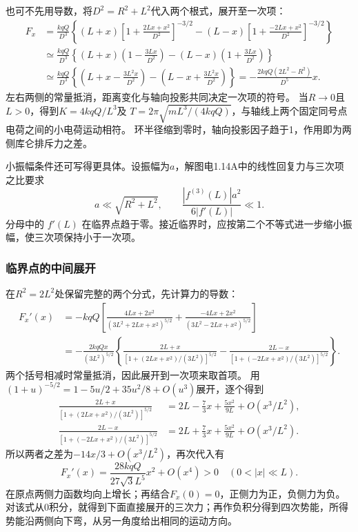\documentclass[UTF8,fontset=fandol,a4paper,11pt]{ctexart}
\begin{document}
也可不先用导数，将$D^2=R^2+L^2$代入两个根式，展开至一次项：
\[
\begin{aligned}
F_x&=\frac{kqQ}{D^3}\left\{(L+x)
 \left[1+\frac{2Lx+x^2}{D^2}\right]^{-3/2}
 -(L-x)\left[1+\frac{-2Lx+x^2}{D^2}\right]^{-3/2}\right\}\\
&\simeq\frac{kqQ}{D^3}\left\{(L+x)\left(1-\frac{3Lx}{D^2}\right)
 -(L-x)\left(1+\frac{3Lx}{D^2}\right)\right\}\\
&\simeq\frac{kqQ}{D^3}\left\{\left(L+x-\frac{3L^2x}{D^2}\right)
 -\left(L-x+\frac{3L^2x}{D^2}\right)\right\}
=-\frac{2kqQ(2L^2-R^2)}{D^5}x.
\end{aligned}
\]
左右两侧的常量抵消，距离变化与轴向投影共同决定一次项的符号。
当$R\to0$且$L>0$，得到$K=4kqQ/L^3$及
$T=2\pi\sqrt{mL^3/(4kqQ)}$，与轴线上两个固定同号点电荷之间的小电荷运动相符。
环半径缩到零时，轴向投影因子趋于1，作用即为两侧库仑排斥力之差。

小振幅条件还可写得更具体。设振幅为$a$，解图电1.14A中的线性回复力与三次项之比要求
\[
a\ll\sqrt{R^2+L^2},\qquad
\frac{|f^{(3)}(L)|a^2}{6|f'(L)|}\ll1.
\]
分母中的 $f'(L)$ 在临界点趋于零。接近临界时，应按第二个不等式进一步缩小振幅，使三次项保持小于一次项。

\subsubsection*{临界点的中间展开}
在$R^2=2L^2$处保留完整的两个分式，先计算力的导数：
\[
\begin{aligned}
F_x'(x)&=-kqQ\left[\frac{4Lx+2x^2}{(3L^2+2Lx+x^2)^{5/2}}
 +\frac{-4Lx+2x^2}{(3L^2-2Lx+x^2)^{5/2}}\right]\\
&=-\frac{2kqQx}{(3L^2)^{5/2}}
\left\{\frac{2L+x}{[1+(2Lx+x^2)/(3L^2)]^{5/2}}
 -\frac{2L-x}{[1+(-2Lx+x^2)/(3L^2)]^{5/2}}\right\}.
\end{aligned}
\]
两个括号相减时常量抵消，因此展开到一次项来取首项。
用$(1+u)^{-5/2}=1-5u/2+35u^2/8+O(u^3)$展开，逐个得到
\[
\begin{aligned}
\frac{2L+x}{[1+(2Lx+x^2)/(3L^2)]^{5/2}}
 &=2L-\frac73x+\frac{5x^2}{9L}+O(x^3/L^2),\\
\frac{2L-x}{[1+(-2Lx+x^2)/(3L^2)]^{5/2}}
 &=2L+\frac73x+\frac{5x^2}{9L}+O(x^3/L^2).
\end{aligned}
\]
所以两者之差为$-14x/3+O(x^3/L^2)$，再次代入有
\[
F_x'(x)=\frac{28kqQ}{27\sqrt3L^5}x^2+O(x^4)>0
\quad(0<|x|\ll L).
\]
在原点两侧力函数均向上增长；再结合$F_x(0)=0$，正侧力为正，负侧力为负。
对该式从0积分，就得到下面直接展开的三次力；再作负积分得到四次势能，所得势能沿两侧向下弯，从另一角度给出相同的运动方向。
\end{document}
